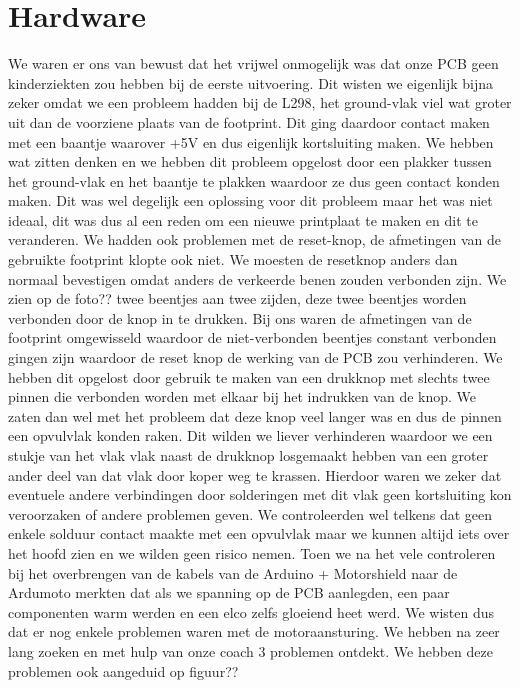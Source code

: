 \section{Hardware}
We waren er ons van bewust dat het vrijwel onmogelijk was dat onze PCB geen kinderziekten zou hebben bij de eerste uitvoering. Dit wisten we eigenlijk bijna zeker omdat we een probleem hadden bij de L298, het ground-vlak viel wat groter uit dan de voorziene plaats van de footprint. Dit ging daardoor contact maken met een baantje waarover +5V en dus eigenlijk kortsluiting maken. We hebben wat zitten denken en we hebben dit probleem opgelost door een plakker tussen het ground-vlak en het baantje te plakken waardoor ze dus geen contact konden maken. Dit was wel degelijk een oplossing voor dit probleem maar het was niet ideaal, dit was dus al een reden om een nieuwe printplaat te maken en dit te veranderen. We hadden ook problemen met de reset-knop, de afmetingen van de gebruikte footprint klopte ook niet. We moesten de resetknop anders dan normaal bevestigen omdat anders de verkeerde benen zouden verbonden zijn. We zien op de foto??%
twee beentjes aan twee zijden, deze twee beentjes worden verbonden door de knop in te drukken. Bij ons waren de afmetingen van de footprint omgewisseld waardoor de niet-verbonden beentjes constant verbonden gingen zijn waardoor de reset knop de werking van de PCB zou verhinderen. We hebben dit opgelost door gebruik te maken van een drukknop met slechts twee pinnen die verbonden worden met elkaar bij het indrukken van de knop. We zaten dan wel met het probleem dat deze knop veel langer was en dus de pinnen een opvulvlak konden raken. Dit wilden we liever verhinderen waardoor we een stukje van het vlak vlak naast de drukknop losgemaakt hebben van een groter ander deel van dat vlak door koper weg te krassen. Hierdoor waren we zeker dat eventuele andere verbindingen door solderingen met dit vlak geen kortsluiting kon veroorzaken of andere problemen geven. We controleerden wel telkens dat geen enkele solduur contact maakte met een opvulvlak maar we kunnen altijd iets over het hoofd zien en we wilden geen risico nemen. Toen we na het vele controleren bij het overbrengen van de kabels van de Arduino + Motorshield naar de Ardumoto merkten dat als we spanning op de PCB aanlegden, een paar componenten warm werden en een elco zelfs gloeiend heet werd. We wisten dus dat er nog enkele problemen waren met de motoraansturing. We hebben na zeer lang zoeken en met hulp van onze coach 3 problemen ontdekt. We hebben deze problemen ook aangeduid op figuur??%

